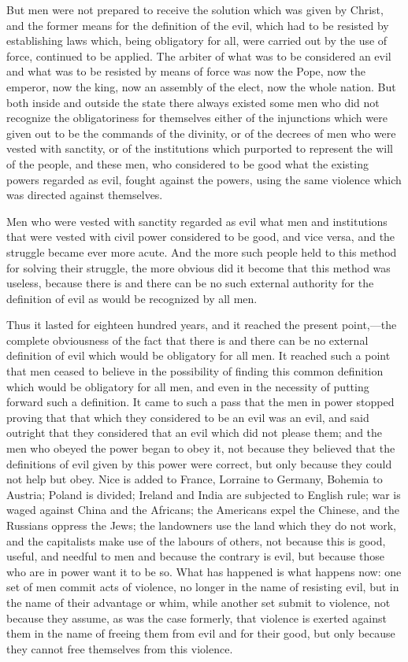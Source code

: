 \documentclass{book}
\begin{document}
But men were not prepared to receive the solution which was given by Christ, and the former means for the definition of the evil, which had to be resisted by establishing laws which, being obligatory for all, were carried out by the use of force, continued to be applied. The arbiter of what was to be considered an evil and what was to be resisted by means of force was now the Pope, now the emperor, now the king, now an assembly of the elect, now the whole nation. But both inside and outside the state there always existed some men who did not recognize the obligatoriness for themselves either of the injunctions which were given out to be the commands of the divinity, or of the decrees of men who were vested with sanctity, or of the institutions which purported to represent the will of the people, and these men, who considered to be good what the existing powers regarded as evil, fought against the powers, using the same violence which was directed against themselves.

Men who were vested with sanctity regarded as evil what men and institutions that were vested with civil power considered to be good, and vice versa, and the struggle became ever more acute. And the more such people held to this method for solving their struggle, the more obvious did it become that this method was useless, because there is and there can be no such external authority for the definition of evil as would be recognized by all men.

Thus it lasted for eighteen hundred years, and it reached the present point,—the complete obviousness of the fact that there is and there can be no external definition of evil which would be obligatory for all men. It reached such a point that men ceased to believe in the possibility of finding this common definition which would be obligatory for all men, and even in the necessity of putting forward such a definition. It came to such a pass that the men in power stopped proving that that which they considered to be an evil was an evil, and said outright that they considered that an evil which did not please them; and the men who obeyed the power began to obey it, not because they believed that the definitions of evil given by this power were correct, but only because they could not help but obey. Nice is added to France, Lorraine to Germany, Bohemia to Austria; Poland is divided; Ireland and India are subjected to English rule; war is waged against China and the Africans; the Americans expel the Chinese, and the Russians oppress the Jews; the landowners use the land which they do not work, and the capitalists make use of the labours of others, not because this is good, useful, and needful to men and because the contrary is evil, but because those who are in power want it to be so. What has happened is what happens now: one set of men commit acts of violence, no longer in the name of resisting evil, but in the name of their advantage or whim, while another set submit to violence, not because they assume, as was the case formerly, that violence is exerted against them in the name of freeing them from evil and for their good, but only because they cannot free themselves from this violence.
\end{document}

